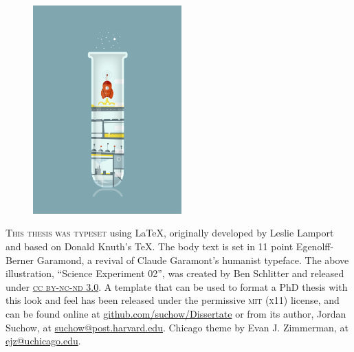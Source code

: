 \newpage

\begin{figure}
  \vspace{50pt}
  \centering
    \includegraphics[width=0.51\textwidth, height=.51\textheight]{endmatter/colophon.png}
\end{figure}


\begin{center}
\parbox{200pt}{\lettrine[lines=3,slope=-2pt,nindent=-4pt]{\textcolor{SchoolColor}{T}}{his thesis was typeset} using \LaTeX, originally developed by Leslie Lamport and based on Donald Knuth's \TeX. The body text is set in 11 point Egenolff-Berner Garamond, a revival of Claude Garamont's humanist typeface. The above illustration, ``Science Experiment 02'', was created by Ben Schlitter and released under \href{http://creativecommons.org/licenses/by-nc-nd/3.0/}{\textsc{cc by-nc-nd 3.0}}. A template that can be used to format a PhD thesis with this look and feel has been released under the permissive \textsc{mit} (\textsc{x}11) license, and can be found online at \href{https://github.com/suchow/Dissertate}{github.com/suchow/Dissertate} or from its author, Jordan Suchow, at \href{mailto:suchow@post.harvard.edu}{suchow@post.harvard.edu}. Chicago theme by Evan J. Zimmerman, at \href{mailto:ejz@uchicago.edu}{ejz@uchicago.edu}.} 
\end{center}